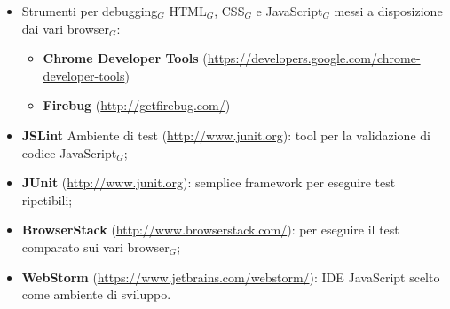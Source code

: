 \begin{itemize}
	\item Strumenti per debugging$_G$ HTML$_G$, CSS$_G$ e JavaScript$_G$ messi a disposizione dai vari browser$_G$:
	    \begin{itemize}
	    	\item \textbf{Chrome Developer Tools} (\href{https://developers.google.com/chrome-developer-tools}
	    	{https://developers.google.com/chrome-developer-tools})
	    	\item \textbf{Firebug}
	    	(\href{http://getfirebug.com/}{http://getfirebug.com/})
	    \end{itemize}
	\item \textbf{JSLint} Ambiente di test (\href{http://www.junit.org}{http://www.junit.org}): tool per la validazione di codice JavaScript$_G$;
	\item \textbf{JUnit} (\href{http://www.junit.org}{http://www.junit.org}): semplice framework per eseguire test ripetibili;
	\item \textbf{BrowserStack} (\href{http://www.browserstack.com/}{http://www.browserstack.com/}):  per eseguire il test comparato sui vari browser$_G$;
	\item \textbf{WebStorm} (\href{https://www.jetbrains.com/webstorm/}{https://www.jetbrains.com/webstorm/}): IDE JavaScript scelto come ambiente di sviluppo.
\end{itemize}

